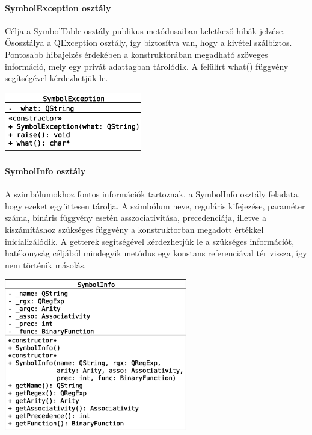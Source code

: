 \documentclass[12pt]{report}
\begin{document}
\paragraph{SymbolException osztály}
Célja a SymbolTable osztály publikus metódusaiban keletkező hibák jelzése. Ősosztálya a QException osztály, így biztosítva van, hogy a kivétel szálbiztos. Pontosabb hibajelzés érdekében a konstruktorában megadható szöveges információ, mely egy privát adattagban tárolódik. A felülírt what() függvény segítségével kérdezhetjük le.
\begin{center}
\includegraphics[width=6cm]{pics/uml/SymbolException}
\end{center}

\paragraph{SymbolInfo osztály}
A szimbólumokhoz fontos információk tartoznak, a SymbolInfo osztály feladata, hogy ezeket együttesen tárolja. A szimbólum neve, reguláris kifejezése, paraméter száma, bináris függvény esetén asszociativitása, precedenciája, illetve a kiszámításhoz szükséges függvény a konstruktorban megadott értékkel inicializálódik. A getterek segítségével kérdezhetjük le a szükséges információt, hatékonyság céljából mindegyik metódus egy konstans referenciával tér vissza, így nem történik másolás.
\begin{center}
\includegraphics[width=8cm]{pics/uml/SymbolInfo}
\end{center}
\end{document}
